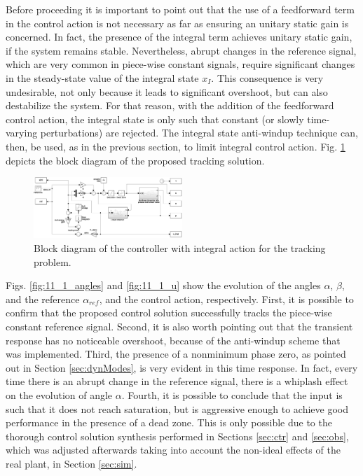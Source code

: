 \documentclass[letterpaper, 10 pt, conference]{ieeeconf}
\begin{document}
Before proceeding it is important to point out that the use of a feedforward term in the control action is not necessary as far as ensuring an unitary static gain is concerned. In fact, the presence of the integral term achieves unitary static gain, if the system remains stable. Nevertheless, abrupt changes in the reference signal, which are very common in piece-wise constant signals, require significant changes in the steady-state value of the integral state $x_I$. This consequence is very undesirable, not only because it leads to significant overshoot, but can also destabilize the system. For that reason, with the addition of the feedforward control action, the integral state is only such that constant (or slowly time-varying perturbations) are rejected. The integral state anti-windup technique can, then, be used, as in the previous section, to limit integral control action. Fig. \ref{fig:blk_track} depicts the block diagram of the proposed tracking solution. 

\begin{figure}[h]
    \centering
    \includegraphics[width = 0.5\textwidth]{figures/block_trck.png}
    \caption{Block diagram of the controller with integral action for the tracking problem.}
    \label{fig:blk_track}
\end{figure}

Figs. \ref{fig:11_1_angles} and \ref{fig:11_1_u} show the evolution of the angles $\alpha$, $\beta$, and the reference $\alpha_{ref}$, and the control action, respectively. First, it is possible to confirm that the proposed control solution successfully tracks the piece-wise constant reference signal. Second, it is also worth pointing out that the transient response has no noticeable overshoot, because of the anti-windup scheme that was implemented. Third, the presence of a nonminimum phase zero, as pointed out in Section \ref{sec:dynModes}, is very evident in this time response. In fact, every time there is an abrupt change in the reference signal, there is a whiplash effect on the evolution of angle $\alpha$. Fourth, it is possible to conclude that the input is such that it does not reach saturation, but is aggressive enough to achieve good performance in the presence of a dead zone. This is only possible due to the thorough control solution synthesis performed in Sections \ref{sec:ctr} and \ref{sec:obs}, which was adjusted afterwards taking into account the non-ideal effects of the real plant, in Section \ref{sec:sim}.  
\end{document}
